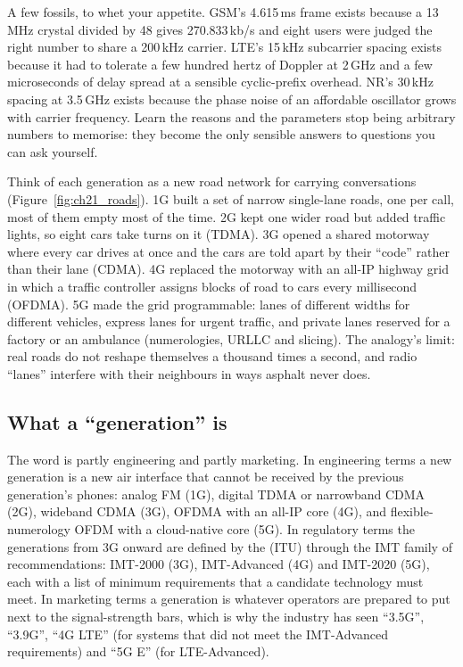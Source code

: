 A few fossils, to whet your appetite. GSM's 4.615\,ms frame exists because a 13\,MHz crystal
divided by 48 gives 270.833\,kb/s and eight users were judged the right number to share a
200\,kHz carrier. LTE's 15\,kHz subcarrier spacing exists because it had to tolerate a few hundred
hertz of Doppler at 2\,GHz and a few microseconds of delay spread at a sensible cyclic-prefix
overhead. NR's 30\,kHz spacing at 3.5\,GHz exists because the phase noise of an affordable
oscillator grows with carrier frequency. Learn the reasons and the parameters stop being arbitrary
numbers to memorise: they become the only sensible answers to questions you can ask yourself.

\begin{analogy}
Think of each generation as a new road network for carrying conversations
(Figure~\ref{fig:ch21_roads}). 1G built a set of narrow single-lane roads, one per call, most of
them empty most of the time. 2G kept one wider road but added traffic lights, so eight cars take
turns on it (TDMA). 3G opened a shared motorway where every car drives at once and the cars are told
apart by their ``code'' rather than their lane (CDMA). 4G replaced the motorway with an all-IP
highway grid in which a traffic controller assigns blocks of road to cars every millisecond
(OFDMA). 5G made the grid programmable: lanes of different widths for different vehicles, express
lanes for urgent traffic, and private lanes reserved for a factory or an ambulance (numerologies,
URLLC and slicing). The analogy's limit: real roads do not reshape themselves a thousand times a
second, and radio ``lanes'' interfere with their neighbours in ways asphalt never does.
\end{analogy}


\subsection{What a ``generation'' is}

The word  is partly engineering and partly marketing. In engineering terms a new
generation is a new air interface that cannot be received by the previous generation's phones:
analog FM (1G), digital TDMA or narrowband CDMA (2G), wideband CDMA (3G), OFDMA with an all-IP core
(4G), and flexible-numerology OFDM with a cloud-native core (5G). In regulatory terms the
generations from 3G onward are defined by the  (ITU)
through the IMT family of recommendations: IMT-2000 (3G), IMT-Advanced (4G) and IMT-2020 (5G), each
with a list of minimum requirements that a candidate technology must meet. In marketing terms a
generation is whatever operators are prepared to put next to the signal-strength bars, which is
why the industry has seen ``3.5G'', ``3.9G'', ``4G LTE'' (for systems that did not meet the
IMT-Advanced requirements) and ``5G E'' (for LTE-Advanced).

